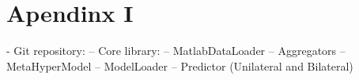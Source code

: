 \chapter{Apendinx I}
- Git repository:
    -- Core library:
        -- MatlabDataLoader
        -- Aggregators
        -- MetaHyperModel
        -- ModelLoader
        -- Predictor (Unilateral and Bilateral)
    



